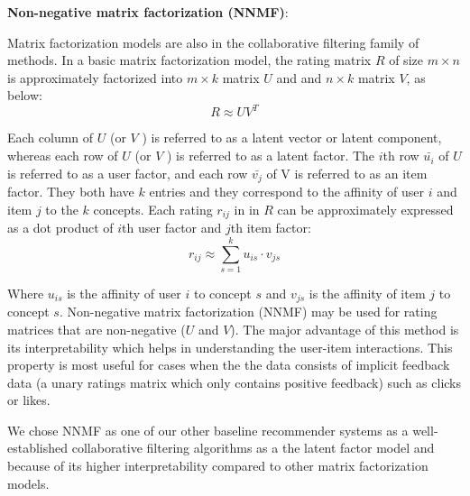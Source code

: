        
        \textbf{Non-negative matrix factorization (NNMF)}:
       
       Matrix factorization models \cite{koren20009mf} are also in the collaborative filtering family of methods. In a basic matrix factorization model, the rating matrix $R$ of size $m\times n$ is approximately factorized into $m\times k$ matrix $U$ and and $n\times k$ matrix $V$, as below:
       \begin{equation}
           R\approx UV^T
       \end{equation}
       
       Each column of $U$ (or $V$ ) is referred to as a latent vector or latent component, whereas each row of $U$ (or $V$ ) is referred to as a latent factor. The $i$th row $\bar{u_i}$ of $U$ is referred to as a user factor, and each row $\bar{v_j}$ of V is referred to as an item factor. They both have $k$ entries and they correspond to the affinity of user $i$ and item $j$ to the $k$ concepts.
       Each rating $r_{ij}$ in in $R$ can be approximately expressed as a dot product of $i$th user factor and $j$th item factor:
       \begin{equation}
           r_{ij} \approx \sum_{s=1}^{k} u_{is} \cdot v_{js}
       \end{equation}
       
       Where $u_{is}$ is the affinity of user $i$ to concept $s$ and $v_{js}$ is the affinity of item $j$ to concept $s$. 
       Non-negative matrix factorization (NNMF) \cite{lee2001algorithms,zhang2006learning} may be used for rating matrices that are non-negative ($U$ and $V$). The major advantage of this method is its interpretability which helps in understanding the user-item interactions. This property is most useful for cases when the the data consists of implicit feedback data (a unary ratings matrix which only contains positive feedback) such as clicks or likes.
       
       We chose NNMF as one of our other baseline recommender systems as a well-established collaborative filtering algorithms as a the latent factor model and because of its higher interpretability compared to other matrix factorization models.
       
       

        
        
